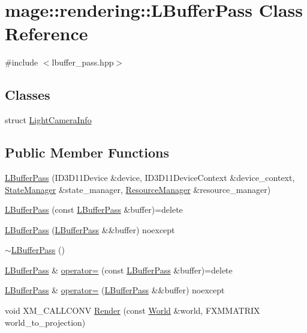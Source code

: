 \hypertarget{classmage_1_1rendering_1_1_l_buffer_pass}{}\section{mage\+:\+:rendering\+:\+:L\+Buffer\+Pass Class Reference}
\label{classmage_1_1rendering_1_1_l_buffer_pass}


{\ttfamily \#include $<$lbuffer\+\_\+pass.\+hpp$>$}

\subsection*{Classes}
\begin{DoxyCompactItemize}
\item 
struct \hyperlink{structmage_1_1rendering_1_1_l_buffer_pass_1_1_light_camera_info}{Light\+Camera\+Info}
\end{DoxyCompactItemize}
\subsection*{Public Member Functions}
\begin{DoxyCompactItemize}
\item 
\hyperlink{classmage_1_1rendering_1_1_l_buffer_pass_a5462eea6f50ed0371185584442d1d21e}{L\+Buffer\+Pass} (I\+D3\+D11\+Device \&device, I\+D3\+D11\+Device\+Context \&device\+\_\+context, \hyperlink{classmage_1_1rendering_1_1_state_manager}{State\+Manager} \&state\+\_\+manager, \hyperlink{classmage_1_1rendering_1_1_resource_manager}{Resource\+Manager} \&resource\+\_\+manager)
\item 
\hyperlink{classmage_1_1rendering_1_1_l_buffer_pass_a575a6e93e446b4d9a0af33844dce0035}{L\+Buffer\+Pass} (const \hyperlink{classmage_1_1rendering_1_1_l_buffer_pass}{L\+Buffer\+Pass} \&buffer)=delete
\item 
\hyperlink{classmage_1_1rendering_1_1_l_buffer_pass_a708f765ebb9416b9e9258f78c926331e}{L\+Buffer\+Pass} (\hyperlink{classmage_1_1rendering_1_1_l_buffer_pass}{L\+Buffer\+Pass} \&\&buffer) noexcept
\item 
\hyperlink{classmage_1_1rendering_1_1_l_buffer_pass_a91261b9de58ca001a4e78cc1dd2c1f4b}{$\sim$\+L\+Buffer\+Pass} ()
\item 
\hyperlink{classmage_1_1rendering_1_1_l_buffer_pass}{L\+Buffer\+Pass} \& \hyperlink{classmage_1_1rendering_1_1_l_buffer_pass_a14814e64f1e99f3144944bea07932a20}{operator=} (const \hyperlink{classmage_1_1rendering_1_1_l_buffer_pass}{L\+Buffer\+Pass} \&buffer)=delete
\item 
\hyperlink{classmage_1_1rendering_1_1_l_buffer_pass}{L\+Buffer\+Pass} \& \hyperlink{classmage_1_1rendering_1_1_l_buffer_pass_aeab4dadf9d131fbfaadb28acfde5c575}{operator=} (\hyperlink{classmage_1_1rendering_1_1_l_buffer_pass}{L\+Buffer\+Pass} \&\&buffer) noexcept
\item 
void X\+M\+\_\+\+C\+A\+L\+L\+C\+O\+NV \hyperlink{classmage_1_1rendering_1_1_l_buffer_pass_a21f63364edbb794e1a70823350e44601}{Render} (const \hyperlink{classmage_1_1rendering_1_1_world}{World} \&world, F\+X\+M\+M\+A\+T\+R\+IX world\+\_\+to\+\_\+projection)
\end{DoxyCompactItemize}
